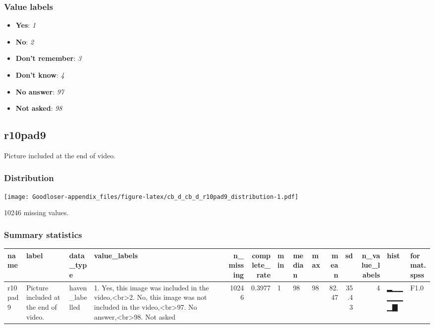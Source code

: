 \documentclass[
]{book}
\providecommand{\tightlist}{%
  \setlength{\itemsep}{0pt}\setlength{\parskip}{0pt}}
\begin{document}
\hypertarget{r10pad8_labels}{%
\subsubsection{Value labels}\label{r10pad8_labels}}

\begin{itemize}
\tightlist
\item
  \textbf{Yes}: \emph{1}
\item
  \textbf{No}: \emph{2}
\item
  \textbf{Don't remember}: \emph{3}
\item
  \textbf{Don't know}: \emph{4}
\item
  \textbf{No answer}: \emph{97}
\item
  \textbf{Not asked}: \emph{98}
\end{itemize}

\hypertarget{r10pad9}{%
\subsection{r10pad9}\label{r10pad9}}

Picture included at the end of video.

\hypertarget{r10pad9_distribution}{%
\subsubsection{Distribution}\label{r10pad9_distribution}}

\texttt{[image: Goodloser-appendix\_files/figure-latex/cb\_d\_cb\_d\_r10pad9\_distribution-1.pdf]}

10246 missing values.

\hypertarget{r10pad9_summary}{%
\subsubsection{Summary statistics}\label{r10pad9_summary}}

\begin{tabular}{l|l|l|l|r|r|l|l|l|r|r|r|l|l}
\hline
name & label & data_type & value_labels & n_missing & complete_rate & min & median & max & mean & sd & n_value_labels & hist & format.spss\\
\hline
r10pad9 & Picture included at the end of video. & haven_labelled & 1. Yes, this image was included in the video,<br>2. No, this image was not included in the video,<br>97. No answer,<br>98. Not asked & 10246 & 0.3977 & 1 & 98 & 98 & 82.47 & 35.43 & 4 & ▂▁▁▁▁▁▁▇ & F1.0\\
\hline
\end{tabular}
\end{document}
